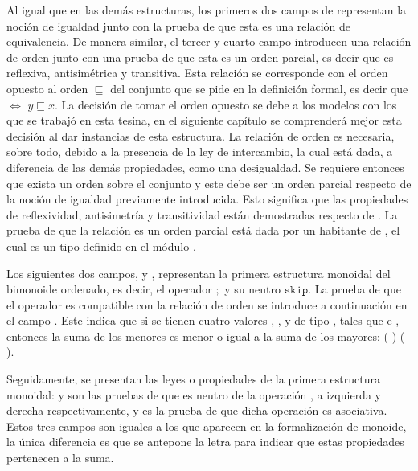 Al igual que en las demás estructuras, los primeros dos campos de  representan la noción de igualdad junto con la prueba de que esta es una relación de equivalencia. De manera similar, el tercer y cuarto campo introducen una relación de orden junto con una prueba de que esta es un orden parcial, es decir que es reflexiva, antisimétrica y transitiva. Esta relación se corresponde con el orden opuesto al orden $\sqsubseteq$ del conjunto que se pide en la definición formal, es decir que    $\Leftrightarrow$ $y \sqsubseteq x$. La decisión de tomar el orden opuesto se debe a los modelos con los que se trabajó en esta tesina, en el siguiente capítulo se comprenderá mejor esta decisión al dar instancias de esta estructura. La relación de orden es necesaria, sobre todo, debido a la presencia de la ley de intercambio, la cual está dada, a diferencia de las demás propiedades, como una desigualdad. Se requiere entonces que exista un orden sobre el conjunto  y este debe ser un orden parcial respecto de la noción de igualdad previamente introducida. Esto significa que las propiedades de reflexividad, antisimetría y transitividad están demostradas respecto de . La prueba  de que la relación  es un orden parcial está dada por un habitante de , el cual es un tipo  definido en el módulo \href{https://agda.github.io/agda-stdlib/Relation.Binary.Structures.html}{}.

Los siguientes dos campos,  y , representan la primera estructura monoidal del bimonoide ordenado, es decir, el operador $;$ y su neutro $\mathtt{skip}$. La prueba de que el operador es compatible con la relación de orden se introduce a continuación en el campo . Este indica que si se tienen cuatro valores , ,  y  de tipo , tales que    e   , entonces la suma de los menores es menor o igual a la suma de los mayores: (  )  (  ). 

Seguidamente, se presentan las leyes o propiedades de la primera estructura monoidal:  y  son las pruebas de que  es neutro de la operación , a izquierda y derecha respectivamente, y  es la prueba de que dicha operación es asociativa. Estos tres campos son iguales a los que aparecen en la formalización de monoide, la única diferencia es que se antepone la letra  para indicar que estas propiedades pertenecen a la suma. 

